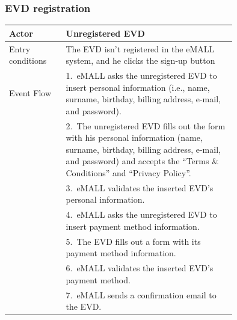 \subsubsection*{EVD registration}
\begin{center}
    \begin{longtable}{lp{0.75\linewidth}}
        \hline
        Actor            & Unregistered EVD                                                                                                                                                                                       \\
        \hline
        Entry conditions & The EVD isn’t registered in the eMALL system, and he clicks the sign-up button                                                                                                                         \\
        \hline
        Event Flow       & 1.\ eMALL asks the unregistered EVD to insert personal information (i.e., name, surname, birthday, billing address, e-mail, and password).                                                             \\
        & 2.\ The unregistered EVD fills out the form with his personal information (name, surname, birthday, billing address, e-mail, and password) and accepts the “Terms \& Conditions” and “Privacy Policy”. \\
        & 3.\ eMALL validates the inserted EVD’s personal information.                                                                                                                                           \\
        & 4.\ eMALL asks the unregistered EVD to insert payment method information.                                                                                                                              \\
        & 5.\ The EVD fills out a form with its payment method information.                                                                                                                                      \\
        & 6.\ eMALL validates the inserted EVD’s payment method.                                                                                                                                                 \\
        & 7.\ eMALL sends a confirmation email to the EVD.                                                                                                                                                       \\

\end{longtable}
\end{center}
